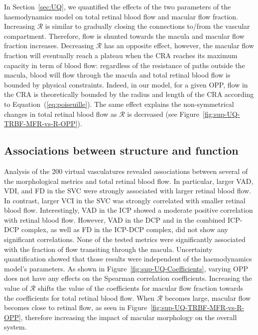 \documentclass[11pt,]{article}
\begin{document}
In Section~\ref{sec:UQ}, we quantified the effects of the two parameters of the haemodynamics model on total retinal blood flow and macular flow fraction.
Increasing $\mathcal R$ is similar to gradually closing the connections to/from the vascular compartment.
Therefore, flow is shunted towards the macula and macular flow fraction increases.
Decreasing $\mathcal R$ has an opposite effect, however, the macular flow fraction will eventually reach a plateau when the CRA reaches its maximum capacity in term of blood flow: regardless of the resistance of paths outside the macula, blood will flow through the macula and total retinal blood flow is bounded by physical constraints.
Indeed, in our model, for a given OPP, flow in the CRA is theoretically bounded by the radius and length of the CRA according to Equation~(\ref{eq:poiseuille}).
The same effect explains the non-symmetrical changes in total retinal blood flow as $\mathcal R$ is decreased (see Figure~\ref{fig:sup-UQ-TRBF-MFR-vs-R-OPP}). 

\subsection{Associations between structure and function}\label{sec:disc-results}

Analysis of the \SI{200}{} virtual vasculatures revealed associations between several of the morphological metrics and total retinal blood flow.
In particular, larger VAD, VDI, and FD in the SVC were strongly associated with larger retinal blood flow.
In contrast, larger VCI in the SVC was strongly correlated with smaller retinal blood flow.
Interestingly, VAD in the ICP showed a moderate positive correlation with retinal blood flow.
However, VAD in the DCP and in the combined ICP-DCP complex, as well as FD in the ICP-DCP complex, did not show any significant correlations.
None of the tested metrics were significantly associated with the fraction of flow transiting through the macula.
Uncertainty quantification showed that those results were independent of the haemodynamics model's parameters.
As shown in Figure~\ref{fig:sup-UQ-Coefficients}, varying OPP does not have any effects on the Spearman correlation coefficients.
Increasing the value of $\mathcal R$ shifts the value of the coefficients for macular flow fraction towards the coefficients for total retinal blood flow.
When $\mathcal R$ becomes large, macular flow becomes close to retinal flow, as seen in Figure~\ref{fig:sup-UQ-TRBF-MFR-vs-R-OPP}, therefore increasing the impact of macular morphology on the overall system. 
\end{document}
